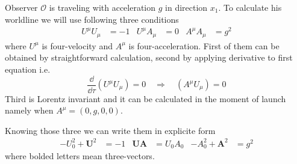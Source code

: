 \problem

Observer $\mathcal{O}$ is traveling with acceleration $g$ in direction $x_1$. To
calculate his worldline we will use following three conditions
%
\begin{align}
	U^\mu U_\mu & = -1 & U^\mu A_\mu & = 0 & A^\mu A_\mu & = g^2
\end{align}
%
where $U^\mu$ is four-velocity and $A^\mu$ is four-acceleration. First of them
can be obtained by straightforward calculation, second by applying derivative
to first equation i.e.
%
\begin{equation}
	\frac{\dd}{\dd \tau} \left(U^\mu U_\mu\right) = 0 \quad \Rightarrow \quad \left(A^\mu U_\mu\right) = 0
\end{equation}
%
Third is Lorentz invariant and it can be calculated in the moment of launch
namely when $A^\mu=(0,g,0,0)$.

Knowing those three we can write them in explicite form
\begin{align}
	-U_0^2 + \boldsymbol{U}^2    & = -1      &
	\boldsymbol{U}\boldsymbol{A} & = U_0 A_0 &
	-A_0^2 + \boldsymbol{A}^2    & = g^2
\end{align}
%
where bolded letters mean three-vectors.


